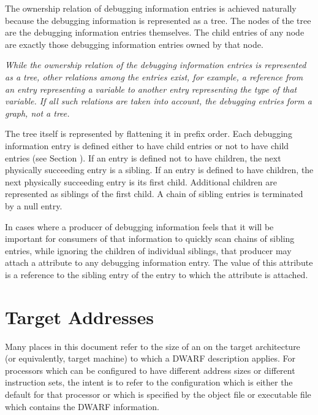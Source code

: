 The ownership relation 
of debugging
information entries is achieved naturally because the debugging
information is represented as a tree. 
The nodes of the tree
are the debugging information entries themselves. 
The child
entries of any node are exactly those debugging information
entries owned by that node.  

\textit{%
While the ownership relation
of the debugging information entries is represented as a
tree, other relations among the entries exist, for example,
a reference from an entry representing a variable to another
entry representing the type of that variable. 
If all such
relations are taken into account, the debugging entries
form a graph, not a tree.  
}

The tree itself is represented
by flattening it in prefix order. 
Each debugging information
entry is defined either to have child entries or not to have
child entries (see Section ). 
If an entry is defined not
to have children, the next physically succeeding entry is a
sibling. 
If an entry is defined to have children, the next
physically succeeding entry is its first child. 
Additional
children are represented as siblings of the first child. 
A chain of sibling entries is terminated by a null entry.

In cases where a producer of debugging information feels that
\hypertarget{chap:DWATsiblingdebugginginformationentryrelationship}{}
it will be important for consumers of that information to
quickly scan chains of sibling entries, while ignoring the
children of individual siblings, that producer may attach 
a
\DWATsibling{} attribute 
to any debugging information entry. 
The
value of this attribute is a reference to the sibling entry
of the entry to which the attribute is attached.


\section{Target Addresses}
\label{chap:targetaddresses}
Many places in this document 
refer
to the size 
of an
on the target architecture (or equivalently, target machine)
to which a DWARF description applies. For processors which
can be configured to have different address sizes or different
instruction sets, the intent is to refer to the configuration
which is either the default for that processor or which is
specified by the object file or executable file which contains
the DWARF information.

